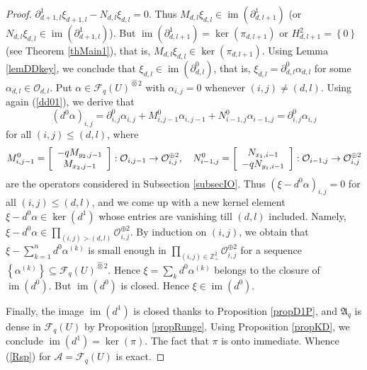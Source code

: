 \documentclass[12pt,reqno]{amsart}%
\theoremstyle{plain}
\numberwithin{theorem}{section} \numberwithin{equation}{section}
\numberwithin{lemma}{section}
\numberwithin{remark}{section}
\numberwithin{example}{section}
\numberwithin{proposition}{section}
\numberwithin{definition}{section}
\numberwithin{corollary}{section}
\begin{document}
\begin{proof}
$\partial_{d+1,l}^{1}\xi_{d+1,l}-N_{d,l}\xi_{d,l}=0$. Thus $M_{d,l}\xi
_{d,l}\in\operatorname{im}\left(  \partial_{d,l+1}^{1}\right)  $ (or
$N_{d,l}\xi_{d,l}\in\operatorname{im}\left(  \partial_{d+1,l}^{1}\right)  $).
But $\operatorname{im}\left(  \partial_{d,l+1}^{1}\right)  =\ker\left(
\pi_{d,l+1}\right)  $ or $H_{d,l+1}^{2}=\left\{  0\right\}  $ (see Theorem
\ref{thMain1}), that is, $M_{d,l}\xi_{d,l}\in\ker\left(  \pi_{d,l+1}\right)
$. Using Lemma \ref{lemDDkey}, we conclude that $\xi_{d,l}\in\operatorname{im}%
\left(  \partial_{d,l}^{0}\right)  $, that is, $\xi_{d,l}=\partial_{d,l}%
^{0}\alpha_{d,l}$ for some $\alpha_{d,l}\in\mathcal{O}_{d,l}$. Put $\alpha
\in\mathcal{F}_{q}\left(  U\right)  ^{\widehat{\otimes}2}$ with $\alpha
_{i,j}=0$ whenever $\left(  i,j\right)  \neq\left(  d,l\right)  $. Using again
(\ref{dd01}), we derive that
\[
\left(  d^{0}\alpha\right)  _{i,j}=\partial_{i,j}^{0}\alpha_{i,j}%
+M_{i,j-1}^{0}\alpha_{i,j-1}+N_{i-1,j}^{0}\alpha_{i-1,j}=\partial_{i,j}%
^{0}\alpha_{i,j}%
\]
for all $\left(  i,j\right)  \leq\left(  d,l\right)  $, where
\[
M_{i,j-1}^{0}=\left[
\begin{array}
[c]{c}%
-qM_{y_{2},j-1}\\
M_{x_{2},j-1}%
\end{array}
\right]  :\mathcal{O}_{i,j-1}\rightarrow\mathcal{O}_{i,j}^{\oplus2},\quad
N_{i-1,j}^{0}=\left[
\begin{array}
[c]{c}%
N_{x_{1},i-1}\\
-qN_{y_{1},i-1}%
\end{array}
\right]  :\mathcal{O}_{i-1,j}\rightarrow\mathcal{O}_{i,j}^{\oplus2}%
\]
are the operators considered in Subsection \ref{subsecIO}. Thus $\left(
\xi-d^{0}\alpha\right)  _{i,j}=0$ for all $\left(  i,j\right)  \leq\left(
d,l\right)  $, and we come up with a new kernel element $\xi-d^{0}\alpha
\in\ker\left(  d^{1}\right)  $ whose entries are vanishing till $\left(
d,l\right)  $ included. Namely, $\xi-d^{0}\alpha\in\prod\limits_{\left(
i,j\right)  >\left(  d,l\right)  }\mathcal{O}_{i,j}^{\oplus2}$. By induction
on $\left(  i,j\right)  $, we obtain that $\xi-\sum_{k=1}^{n}d^{0}%
\alpha^{\left(  k\right)  }$ is small enough in $\prod\limits_{\left(
i,j\right)  \in\mathbb{Z}_{+}^{2}}\mathcal{O}_{i,j}^{\oplus2}$ for a sequence
$\left\{  \alpha^{\left(  k\right)  }\right\}  \subseteq\mathcal{F}_{q}\left(
U\right)  ^{\widehat{\otimes}2}$. Hence $\xi=\sum_{k}d^{0}\alpha^{\left(
k\right)  }$ belongs to the closure of $\operatorname{im}\left(  d^{0}\right)
$. But $\operatorname{im}\left(  d^{0}\right)  $ is closed. Hence $\xi
\in\operatorname{im}\left(  d^{0}\right)  $.

Finally, the image $\operatorname{im}\left(  d^{1}\right)  $ is closed thanks
to Proposition \ref{propD1P}, and $\mathfrak{A}_{q}$ is dense in
$\mathcal{F}_{q}\left(  U\right)  $ by Proposition \ref{propRunge}. Using
Proposition \ref{propKD}, we conclude $\operatorname{im}\left(  d^{1}\right)
=\ker\left(  \pi\right)  $. The fact that $\pi$ is onto immediate. Whence
(\ref{Rsp}) for $\mathcal{A=F}_{q}\left(  U\right)  $ is exact.
\end{proof}
\end{document}

